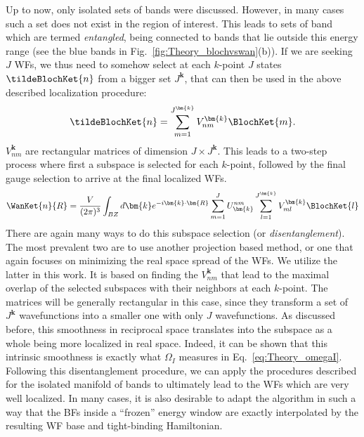 Up to now, only isolated sets of bands were discussed. However, in many cases such a set does not exist in the region of interest.
This leads to sets of band which are termed {\it entangled}, being connected to bands that lie outside this energy range (see the blue bands in Fig.~\ref{fig:Theory_blochvswan}(b)).
If we are seeking $J$ WFs, we thus need to somehow select at each $k$-point $J$ states $\tildeBlochKet{n}$ from a bigger set $J^{\bm{k}}$, that can then be used in the above described localization procedure:
\begin{equation}
	\tildeBlochKet{n} = \sum_{m=1}^{J^{\bm{k}}}V_{nm}^{\bm{k}} \BlochKet{m}.
\end{equation}
$V_{nm}^{\bm{k}}$ are rectangular matrices of dimension $J\times J^{\bm{k}}$.
This leads to a two-step process where first a subspace is selected for each $k$-point, followed by the final gauge selection to arrive at the final localized WFs.
\begin{equation}
	\WanKet{n}{R} = \frac{V}{(2\pi)^3} \int_{BZ} d\bm{k} e^{-i \bm{k} \cdot \bm{R}} \sum_{m=1}^J U^{nm}_{\bm{k}} \sum_{l=1}^{J^{\bm{k}}} V_{ml}^{\bm{k}} \BlochKet{l}
\end{equation}
There are again many ways to do this subspace selection (or {\it disentanglement}).
The most prevalent two are to use another projection based method, or one that again focuses on minimizing the real space spread of the WFs.
We utilize the latter in this work.
It is based on finding the $V_{nm}^{\bm{k}}$ that lead to the maximal overlap of the selected subspaces with their neighbors at each $k$-point.
The matrices will be generally rectangular in this case, since they transform a set of $J^{\bm{k}}$ wavefunctions into a smaller one with only $J$ wavefunctions.
As discussed before, this smoothness in reciprocal space translates into the subspace as a whole being more localized in real space.
Indeed, it can be shown \cite{Marzari2012} that this intrinsic smoothness is exactly what $\Omega_I$ measures in Eq.~\ref{eq:Theory_omegaI}. 
Following this disentanglement procedure, we can apply the procedures described for the isolated manifold of bands to ultimately lead to the WFs which are very well localized.
In many cases, it is also desirable to adapt the algorithm in such a way that the BFs inside a ``frozen'' energy window are exactly interpolated by the resulting WF base and tight-binding Hamiltonian.

